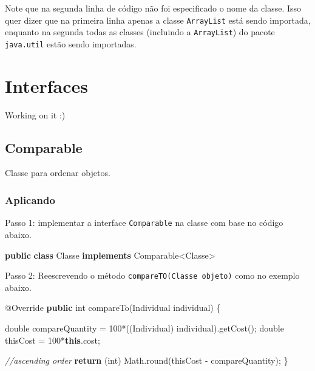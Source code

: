 \documentclass[
]{book}
\newenvironment{Shaded}{\begin{snugshade}}{\end{snugshade}}
\newcommand{\AttributeTok}[1]{\textcolor[rgb]{0.77,0.63,0.00}{#1}}
\newcommand{\BuiltInTok}[1]{#1}
\newcommand{\CommentTok}[1]{\textcolor[rgb]{0.56,0.35,0.01}{\textit{#1}}}
\newcommand{\DataTypeTok}[1]{\textcolor[rgb]{0.13,0.29,0.53}{#1}}
\newcommand{\DecValTok}[1]{\textcolor[rgb]{0.00,0.00,0.81}{#1}}
\newcommand{\FunctionTok}[1]{\textcolor[rgb]{0.00,0.00,0.00}{#1}}
\newcommand{\KeywordTok}[1]{\textcolor[rgb]{0.13,0.29,0.53}{\textbf{#1}}}
\newcommand{\NormalTok}[1]{#1}
\begin{document}
Note que na segunda linha de código não foi especificado o nome da classe. Isso quer dizer que na primeira linha apenas a classe \texttt{ArrayList} está sendo importada, enquanto na segunda todas as classes (incluindo a \texttt{ArrayList}) do pacote \texttt{java.util} estão sendo importadas.

\hypertarget{interfaces}{%
\section{Interfaces}\label{interfaces}}

Working on it :)

\hypertarget{comparable}{%
\subsection{Comparable}\label{comparable}}

Classe para ordenar objetos.

\hypertarget{aplicando}{%
\subsubsection*{Aplicando}\label{aplicando}}

Passo 1: implementar a interface \texttt{Comparable} na classe com base no código abaixo.

\begin{Shaded}
\begin{Highlighting}[]
\KeywordTok{public} \KeywordTok{class}\NormalTok{ Classe }\KeywordTok{implements} \BuiltInTok{Comparable}\NormalTok{<Classe>}
\end{Highlighting}
\end{Shaded}

Passo 2: Reescrevendo o método \texttt{compareTO(Classe\ objeto)} como no exemplo abaixo.

\begin{Shaded}
\begin{Highlighting}[]
\AttributeTok{@Override}
\KeywordTok{public} \DataTypeTok{int} \FunctionTok{compareTo}\NormalTok{(Individual individual) \{}

    \DataTypeTok{double}\NormalTok{ compareQuantity = }\DecValTok{100}\NormalTok{*((Individual) individual).}\FunctionTok{getCost}\NormalTok{();}
    \DataTypeTok{double}\NormalTok{ thisCost = }\DecValTok{100}\NormalTok{*}\KeywordTok{this}\NormalTok{.}\FunctionTok{cost}\NormalTok{;}

    \CommentTok{//ascending order}
    \KeywordTok{return}\NormalTok{ (}\DataTypeTok{int}\NormalTok{) }\BuiltInTok{Math}\NormalTok{.}\FunctionTok{round}\NormalTok{(thisCost - compareQuantity);}
\NormalTok{\}}
\end{Highlighting}
\end{Shaded}
\end{document}

